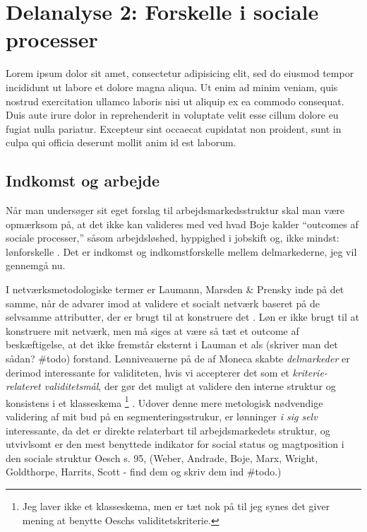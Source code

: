 

\chapter{Delanalyse 2: Forskelle i sociale processer \label{kapitel_delanalyse2_socialeprocesser}}

Lorem ipsum dolor sit amet, consectetur adipisicing elit, sed do eiusmod
tempor incididunt ut labore et dolore magna aliqua. Ut enim ad minim veniam,
quis nostrud exercitation ullamco laboris nisi ut aliquip ex ea commodo
consequat. Duis aute irure dolor in reprehenderit in voluptate velit esse
cillum dolore eu fugiat nulla pariatur. Excepteur sint occaecat cupidatat non
proident, sunt in culpa qui officia deserunt mollit anim id est laborum.

\section{Indkomst og arbejde \label{sec_delanalyse2_loen}}

Når man undersøger sit eget forslag til arbejdsmarkedsstruktur skal man være opmærksom på, at det ikke kan valideres med ved hvad Boje kalder “outcomes af sociale processer,” såsom arbejdsløshed, hyppighed i jobskift og, ikke mindst: lønforskelle \parencite[28]{Boje1985}. Det er indkomst og indkomstforskelle mellem delmarkederne, jeg vil gennemgå nu. 

I netværksmetodologiske termer er Laumann, Marsden \& Prensky inde på det samme, når de advarer imod at validere et socialt netværk baseret på de selvsamme attributter, der er brugt til at konstruere det \parencite[29]{Laumann1983}. Løn er ikke brugt til at konstruere mit netværk, men må siges at være så tæt et outcome af beskæftigelse, at det ikke fremstår eksternt i Lauman et als (skriver man det sådan? \#todo) forstand. Lønniveauerne på de af Moneca skabte \emph{delmarkeder} er derimod interessante for validiteten, hvis vi accepterer det som et \emph{kriterie-relateret validitetsmål}, der gør det muligt at validere den interne struktur og konsistens i et klasseskema \parencite[94]{Oesch2006a}%
%
\footnote{ Jeg laver ikke et klasseskema, men er tæt nok på til jeg synes det giver mening at benytte Oeschs validitetskriterie.}%
%
. Udover denne mere metologisk nødvendige validering af mit bud på en segmenteringsstrukur, er lønninger \emph{i sig selv} interessante, da det er direkte relaterbart til arbejdsmarkedets struktur, og utvivlsomt er den mest benyttede indikator for social status og magtposition i den sociale struktur Oesch s. 95, (Weber, Andrade, Boje, Marx, Wright, Goldthorpe, Harrits, Scott - find dem og skriv dem ind \#todo.) 

